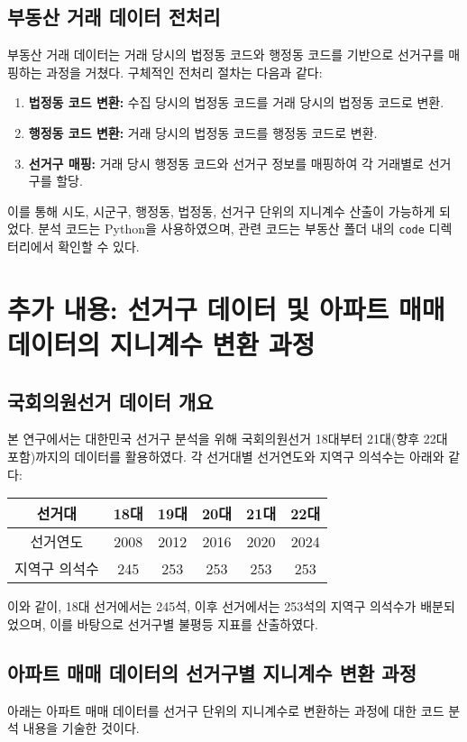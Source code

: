 \documentclass[a4paper,10pt]{article}
\begin{document}
\subsection{부동산 거래 데이터 전처리}
부동산 거래 데이터는 거래 당시의 법정동 코드와 행정동 코드를 기반으로 선거구를 매핑하는 과정을 거쳤다. 구체적인 전처리 절차는 다음과 같다:
\begin{enumerate}
    \item \textbf{법정동 코드 변환:} 수집 당시의 법정동 코드를 거래 당시의 법정동 코드로 변환.
    \item \textbf{행정동 코드 변환:} 거래 당시의 법정동 코드를 행정동 코드로 변환.
    \item \textbf{선거구 매핑:} 거래 당시 행정동 코드와 선거구 정보를 매핑하여 각 거래별로 선거구를 할당.
\end{enumerate}
이를 통해 시도, 시군구, 행정동, 법정동, 선거구 단위의 지니계수 산출이 가능하게 되었다. 분석 코드는 Python을 사용하였으며, 관련 코드는 부동산 폴더 내의 \texttt{code} 디렉터리에서 확인할 수 있다.

\section{추가 내용: 선거구 데이터 및 아파트 매매 데이터의 지니계수 변환 과정}

\subsection{국회의원선거 데이터 개요}
본 연구에서는 대한민국 선거구 분석을 위해 국회의원선거 18대부터 21대(향후 22대 포함)까지의 데이터를 활용하였다. 각 선거대별 선거연도와 지역구 의석수는 아래와 같다:

\begin{center}
\begin{tabular}{cccccc}
\hline
선거대 & 18대 & 19대 & 20대 & 21대 & 22대 \\
\hline
선거연도 & 2008 & 2012 & 2016 & 2020 & 2024 \\
지역구 의석수 & 245 & 253 & 253 & 253 & 253 \\
\hline
\end{tabular}
\end{center}

이와 같이, 18대 선거에서는 245석, 이후 선거에서는 253석의 지역구 의석수가 배분되었으며, 이를 바탕으로 선거구별 불평등 지표를 산출하였다.

\subsection{아파트 매매 데이터의 선거구별 지니계수 변환 과정}
아래는 아파트 매매 데이터를 선거구 단위의 지니계수로 변환하는 과정에 대한 코드 분석 내용을 기술한 것이다.
\end{document}
